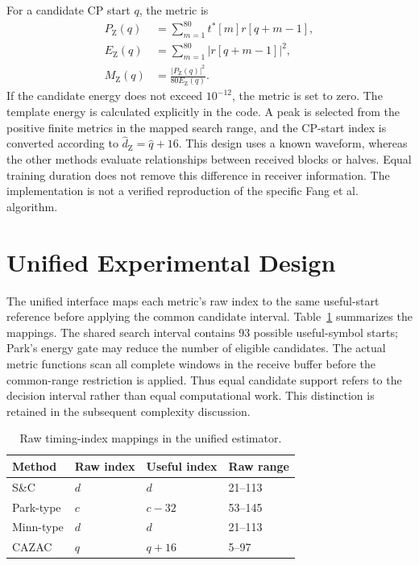 For a candidate CP start $q$, the metric is
\begin{align}
 P_{\mathrm{Z}}(q)&=\sum_{m=1}^{80}t^*[m]r[q+m-1],\\
 E_{\mathrm{Z}}(q)&=\sum_{m=1}^{80}|r[q+m-1]|^2,\\
 M_{\mathrm{Z}}(q)&=\frac{|P_{\mathrm{Z}}(q)|^2}{80E_{\mathrm{Z}}(q)}.
\end{align}
If the candidate energy does not exceed $10^{-12}$, the metric is set to zero. The template energy is calculated explicitly in the code. A peak is selected from the positive finite metrics in the mapped search range, and the CP-start index is converted according to $\hat d_{\mathrm{Z}}=\hat q+16$. This design uses a known waveform, whereas the other methods evaluate relationships between received blocks or halves. Equal training duration does not remove this difference in receiver information. The implementation is not a verified reproduction of the specific Fang et al. algorithm.

\section{Unified Experimental Design}
The unified interface maps each metric's raw index to the same useful-start reference before applying the common candidate interval. Table~\ref{tab:method_indices} summarizes the mappings. The shared search interval contains 93 possible useful-symbol starts; Park's energy gate may reduce the number of eligible candidates. The actual metric functions scan all complete windows in the receive buffer before the common-range restriction is applied. Thus equal candidate support refers to the decision interval rather than equal computational work. This distinction is retained in the subsequent complexity discussion.

\begin{table}[htbp]
\centering
\caption{Raw timing-index mappings in the unified estimator.}
\label{tab:method_indices}
\small
\begin{tabular}{llll}
\hline
Method & Raw index & Useful index & Raw range\\ \hline
S\&C & $d$ & $d$ & 21--113\\
Park-type & $c$ & $c-32$ & 53--145\\
Minn-type & $d$ & $d$ & 21--113\\
CAZAC & $q$ & $q+16$ & 5--97\\ \hline
\end{tabular}
\end{table}

